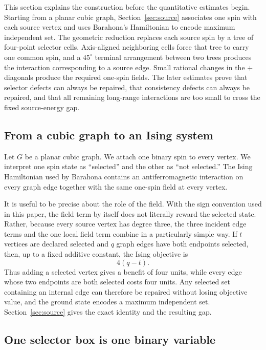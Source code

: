 \documentclass[12pt,a4paper]{article}
\begin{document}
This section explains the construction before the quantitative estimates begin.  Starting from a planar cubic graph, Section~\ref{sec:source} associates one spin with each source vertex and uses Barahona's Hamiltonian to encode maximum independent set.  The geometric reduction replaces each source spin by a tree of four-point selector cells.  Axis-aligned neighboring cells force that tree to carry one common spin, and a $45^\circ$ terminal arrangement between two trees produces the interaction corresponding to a source edge.  Small rational changes in the $+$ diagonals produce the required one-spin fields.  The later estimates prove that selector defects can always be repaired, that consistency defects can always be repaired, and that all remaining long-range interactions are too small to cross the fixed source-energy gap.

\subsection*{From a cubic graph to an Ising system}

Let $G$ be a planar cubic graph.  We attach one binary spin to every vertex.  We interpret one spin state as ``selected'' and the other as ``not selected.''  The Ising Hamiltonian used by Barahona contains an antiferromagnetic interaction on every graph edge together with the same one-spin field at every vertex.

It is useful to be precise about the role of the field.  With the sign convention used in this paper, the field term by itself does not literally reward the selected state.  Rather, because every source vertex has degree three, the three incident edge terms and the one local field term combine in a particularly simple way.  If $t$ vertices are declared selected and $q$ graph edges have both endpoints selected, then, up to a fixed additive constant, the Ising objective is
\[
 4(q-t).
\]
Thus adding a selected vertex gives a benefit of four units, while every edge whose two endpoints are both selected costs four units.  Any selected set containing an internal edge can therefore be repaired without losing objective value, and the ground state encodes a maximum independent set.  Section~\ref{sec:source} gives the exact identity and the resulting gap.

\subsection*{One selector box is one binary variable}
\end{document}
